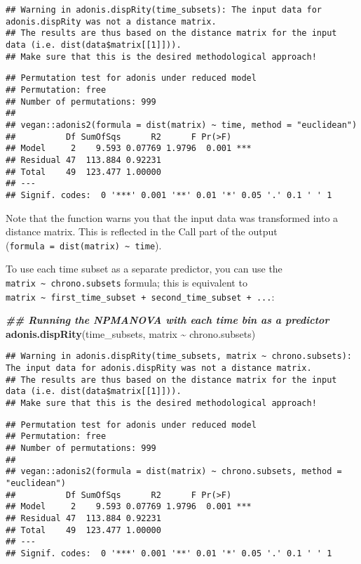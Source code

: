 \documentclass[
]{book}
\newenvironment{Shaded}{\begin{snugshade}}{\end{snugshade}}
\newcommand{\DocumentationTok}[1]{\textcolor[rgb]{0.56,0.35,0.01}{\textbf{\textit{#1}}}}
\newcommand{\FunctionTok}[1]{\textcolor[rgb]{0.13,0.29,0.53}{\textbf{#1}}}
\newcommand{\NormalTok}[1]{#1}
\newcommand{\SpecialCharTok}[1]{\textcolor[rgb]{0.81,0.36,0.00}{\textbf{#1}}}
\begin{document}
\begin{verbatim}
## Warning in adonis.dispRity(time_subsets): The input data for adonis.dispRity was not a distance matrix.
## The results are thus based on the distance matrix for the input data (i.e. dist(data$matrix[[1]])).
## Make sure that this is the desired methodological approach!
\end{verbatim}

\begin{verbatim}
## Permutation test for adonis under reduced model
## Permutation: free
## Number of permutations: 999
## 
## vegan::adonis2(formula = dist(matrix) ~ time, method = "euclidean")
##          Df SumOfSqs      R2      F Pr(>F)    
## Model     2    9.593 0.07769 1.9796  0.001 ***
## Residual 47  113.884 0.92231                  
## Total    49  123.477 1.00000                  
## ---
## Signif. codes:  0 '***' 0.001 '**' 0.01 '*' 0.05 '.' 0.1 ' ' 1
\end{verbatim}

Note that the function warns you that the input data was transformed into a distance matrix.
This is reflected in the Call part of the output (\texttt{formula\ =\ dist(matrix)\ \textasciitilde{}\ time}).

To use each time subset as a separate predictor, you can use the \texttt{matrix\ \textasciitilde{}\ chrono.subsets} formula; this is equivalent to \texttt{matrix\ \textasciitilde{}\ first\_time\_subset\ +\ second\_time\_subset\ +\ ...}:

\begin{Shaded}
\begin{Highlighting}[]
\DocumentationTok{\#\# Running the NPMANOVA with each time bin as a predictor}
\FunctionTok{adonis.dispRity}\NormalTok{(time\_subsets, matrix }\SpecialCharTok{\textasciitilde{}}\NormalTok{ chrono.subsets)}
\end{Highlighting}
\end{Shaded}

\begin{verbatim}
## Warning in adonis.dispRity(time_subsets, matrix ~ chrono.subsets): The input data for adonis.dispRity was not a distance matrix.
## The results are thus based on the distance matrix for the input data (i.e. dist(data$matrix[[1]])).
## Make sure that this is the desired methodological approach!
\end{verbatim}

\begin{verbatim}
## Permutation test for adonis under reduced model
## Permutation: free
## Number of permutations: 999
## 
## vegan::adonis2(formula = dist(matrix) ~ chrono.subsets, method = "euclidean")
##          Df SumOfSqs      R2      F Pr(>F)    
## Model     2    9.593 0.07769 1.9796  0.001 ***
## Residual 47  113.884 0.92231                  
## Total    49  123.477 1.00000                  
## ---
## Signif. codes:  0 '***' 0.001 '**' 0.01 '*' 0.05 '.' 0.1 ' ' 1
\end{verbatim}
\end{document}
